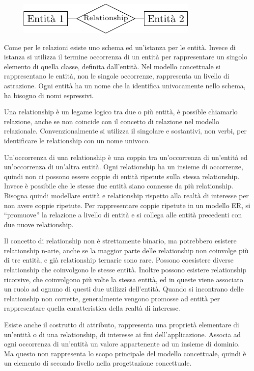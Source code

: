\documentclass{article}
\numberwithin{equation}{subsection}
\begin{document}
\begin{figure}[H]%
    \centering%
    \includegraphics[scale=1.25]{entita_relationship.pdf}%
\end{figure}

Come per le relazioni esiste uno schema ed un'istanza per le entità. Invece di istanza si utilizza il termine occorrenza di un entità per rappresentare un singolo 
elemento di quella classe, definita dall'entità. Nel modello concettuale si rappresentano le entità, non le singole occorrenze, rappresenta un livello di astrazione. 
Ogni entità ha un nome che la identifica univocamente nello schema, ha bisogno di nomi espressivi. 


Una relationship è un legame logico tra due o più entità, è possible chiamarlo relazione, anche se non coincide con il concetto di relazione nel modello relazionale. 
Convenzionalmente si utilizza il singolare e sostantivi, non verbi, per identificare le relationship con un nome univoco. 

Un'occorrenza di una relationship è una coppia tra un'occorrenza di un'entità ed un'occorrenza di un'altra entità. Ogni relationship ha un insieme di occorrenze, quindi 
non ci possono essere coppie di entità ripetute sulla stessa relationship. Invece è possibile che le stesse due entità siano connesse da più relationship.   
Bisogna quindi modellare entità e relationship rispetto alla realtà di interesse per non avere coppie ripetute. Per rappresentare coppie ripetute in un modello ER, si 
``promuove'' la relazione a livello di entità e si collega alle entità precedenti con due nuove relationship. 

Il concetto di relationship non è strettamente binario, ma potrebbero esistere relationship n-arie, anche se la maggior parte delle relationship non coinvolge più di tre 
entità, e già relationship ternarie sono rare. 
Possono coesistere diverse relationship che coinvolgono le stesse entità. Inoltre possono esistere relationship ricorsive, che coinvolgono più volte la stessa entità, 
ed in queste viene associato un ruolo ad ognuno di questi due utilizzi dell'entità. Quando si incontrano delle relationship non corrette, generalmente vengono promosse ad entità per rappresentare 
quella caratteristica della realtà di interesse. 

Esiste anche il costrutto di attributo, rappresenta una proprietà elementare di un'entità o di una relationship, di interesse ai fini dell'applicazione. Associa ad ogni 
occorrenza di un'entità un valore appartenente ad un insieme di dominio. Ma questo non rappresenta lo scopo principale del modello concettuale, quindi è un elemento 
di secondo livello nella progettazione concettuale. 
\end{document}
